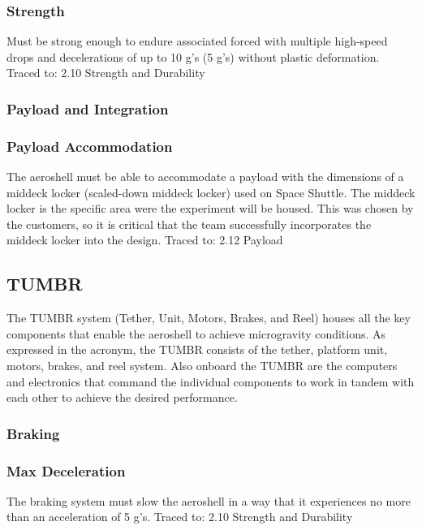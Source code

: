 \subsubsection*{Strength}
\indent\indent Must be strong enough to endure associated forced with multiple high-speed drops and decelerations of up to 10 g’s (5 g’s) without plastic deformation. Traced to: 2.10 Strength and Durability

\subsubsection{Payload and Integration}

\subsubsection*{Payload Accommodation}
\indent\indent The aeroshell must be able to accommodate a payload with the dimensions of a middeck locker (scaled-down middeck locker) used on Space Shuttle. The middeck locker is the specific area were the experiment will be housed. This was chosen by the customers, so it is critical that the team successfully incorporates the middeck locker into the design. Traced to: 2.12 Payload


\subsection{TUMBR}

The TUMBR system (Tether, Unit, Motors, Brakes, and Reel) houses all the key components that enable the aeroshell to achieve microgravity conditions. As expressed in the acronym, the TUMBR consists of the tether, platform unit, motors, brakes, and reel system. Also onboard the TUMBR are the computers and electronics that command the individual components to work in tandem with each other to achieve the desired performance. 

\subsubsection{Braking}

\subsubsection*{Max Deceleration}
\indent\indent The braking system must slow the aeroshell in a way that it experiences no more than an acceleration of 5 g’s. Traced to: 2.10 Strength and Durability

